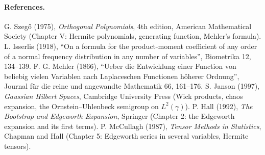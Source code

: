 \paragraph{References.}
G. Szeg\H{o} (1975), \emph{Orthogonal Polynomials}, 4th edition, American Mathematical
Society (Chapter V: Hermite polynomials, generating function, Mehler's formula).
L. Isserlis (1918), ``On a formula for the product-moment coefficient of any order of a
normal frequency distribution in any number of variables'', Biometrika 12, 134--139.
F. G. Mehler (1866), ``Ueber die Entwicklung einer Function von beliebig vielen
Variablen nach Laplaceschen Functionen h\"oherer Ordnung'', Journal f\"ur die reine und
angewandte Mathematik 66, 161--176.
S. Janson (1997), \emph{Gaussian Hilbert Spaces}, Cambridge University Press (Wick
products, chaos expansion, the Ornstein--Uhlenbeck semigroup on $L^2(\gamma)$).
P. Hall (1992), \emph{The Bootstrap and Edgeworth Expansion}, Springer (Chapter 2:
the Edgeworth expansion and its first terms).
P. McCullagh (1987), \emph{Tensor Methods in Statistics}, Chapman and Hall (Chapter 5:
Edgeworth series in several variables, Hermite tensors).
